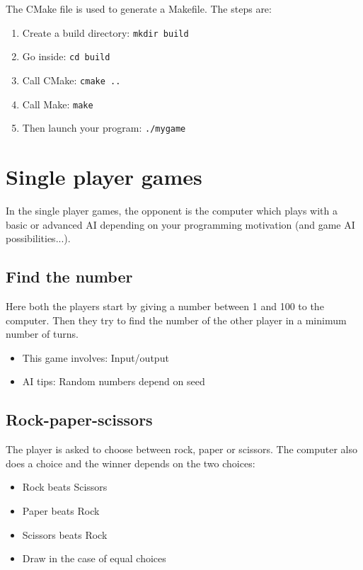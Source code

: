 \documentclass{ecnreport}
\begin{document}
The CMake file is used to generate a Makefile. The steps are:
\begin{enumerate}
 \item Create a build directory: \texttt{mkdir build}
 \item Go inside: \texttt{cd build}
 \item Call CMake: \texttt{cmake ..}
 \item Call Make: \texttt{make}
 \item Then launch your program: \texttt{./mygame}
\end{enumerate}


\section{Single player games}

In the single player games, the opponent is the computer which plays with a basic or advanced AI depending on your programming
motivation (and game AI possibilities...).


\subsection{Find the number}

Here both the players start by giving a number between 1 and 100 to the computer. Then they try to find the number of the other player
in a minimum number of turns.

\begin{itemize}
 \item This game involves: Input/output
 \item AI tips: Random numbers depend on seed
\end{itemize}

\subsection{Rock-paper-scissors}

The player is asked to choose between rock, paper or scissors. The computer also does a choice and the winner depends on the two choices:
\begin{itemize}
 \item Rock beats Scissors
 \item Paper beats Rock
 \item Scissors beats Rock
 \item Draw in the case of equal choices
\end{itemize}
\end{document}
